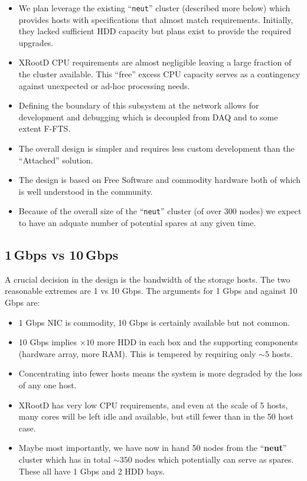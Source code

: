 \documentclass[pdftex,12pt,letter]{article}
\newcommand{\xrd}{XRootD\xspace}
\begin{document}
\begin{itemize}
\item We plan leverage the existing ``\texttt{neut}'' cluster
  (described more below) which provides hosts with specifications that
  almost match requirements.  Initially, they lacked sufficient HDD
  capacity but plans exist to provide the required upgrades.
\item \xrd CPU requirements are almost negligible leaving a large
  fraction of the cluster available.  This ``free'' excess CPU
  capacity serves as a contingency against unexpected or ad-hoc
  processing needs.
\item Defining the boundary of this subsystem at the network allows
  for development and debugging which is decoupled from DAQ and to
  some extent F-FTS.
\item The overall design is simpler and requires less custom
  development than the ``Attached'' solution.
\item The design is based on Free Software and commodity hardware both
  of which is well understood in the community.

\item Because of the overall size of the  ``\texttt{neut}'' cluster (of over 300 nodes)
we expect to have an adquate number of potential spares at any given time.

\end{itemize}

\subsection{1\,Gbps vs 10\,Gbps}

A crucial decision in the design is the bandwidth of the storage
hosts.  The two reasonable extremes are 1 vs 10 Gbps.  The arguments
for 1 Gbps and against 10 Gbps are:

\begin{itemize}
\item 1 Gbps NIC is commodity, 10 Gbps is certainly available but not
  common.
\item 10 Gbps implies $\times 10$ more HDD in each box and the
  supporting components (hardware array, more RAM).  This is tempered
  by requiring only $\sim 5$ hosts.
\item Concentrating into fewer hosts means the system is more degraded
  by the loss of any one host.
\item \xrd has very low CPU requirements, and even at the scale of 5
  hosts, many cores will be left idle and available, but still fewer
  than in the 50 host case.
\item Maybe most importantly, we have now in hand 50 nodes from the
  ``\textbf{neut}'' cluster which has in total $\sim 350$ nodes which
  potentially can serve as spares.  These all have 1 Gbps and 2 HDD
  bays.
\end{itemize}
\end{document}
